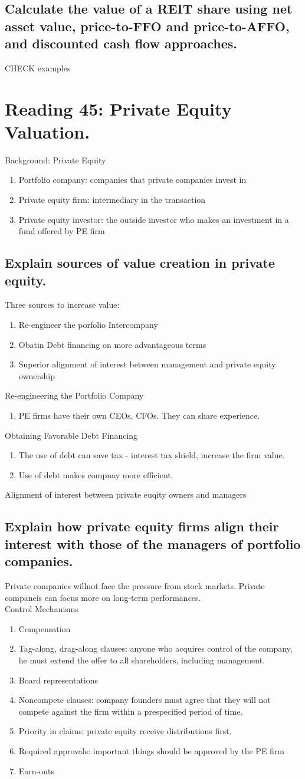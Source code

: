 \documentclass{article}
\newcommand{\be}{\begin{enumerate}}
\newcommand{\ee}{\end{enumerate}}
\begin{document}
\subsection{Calculate the value of a REIT share using net asset value, price-to-FFO and price-to-AFFO,
and discounted cash flow approaches.}
CHECK examples


\section{Reading 45: Private Equity Valuation.}
Background: Private Equity\\
\be
    \item Portfolio company: companies that private companies invest in
    \item Private equity firm: intermediary in the transaction
    \item Private equity investor: the outside investor who makes an investment in a fund offered
    by PE firm
\ee
\subsection{Explain sources of value creation in private equity.}
Three sources to increase value:
\be
    \item Re-engineer the porfolio Intercompany
    \item Obatin Debt financing on more advantageous terms
    \item Superior alignment of interest between management and private equity ownership
\ee
Re-engineering the Portfolio Company
\be
    \item PE firms have their own CEOs, CFOs. They can share experience.
\ee
Obtaining Favorable Debt Financing
\be
    \item The use of debt can save tax - interest tax shield, increase the firm value.
    \item Use of debt makes compnay more efficient.
\ee
Alignment of interest between private euqity owners and managers
\subsection{Explain how private equity firms align their interest with those of the managers
of portfolio companies.}
Private companies willnot face the pressure from stock markets.
Private companeis can focus more on long-term performances.
\\Control Mechanisms
\be
    \item Compensation
    \item Tag-along, drag-along clauses: anyone who acquires control of the company,
    he must extend the offer to all shareholders, including management.
    \item Board representations
    \item Noncompete clauses: company founders must agree that they will not compete against the
    firm within a prespecified period of time.
    \item Priority in claims: private equity receive distributions first.
    \item Required approvals: important things should be approved by the PE firm
    \item Earn-outs
\ee
\end{document}
